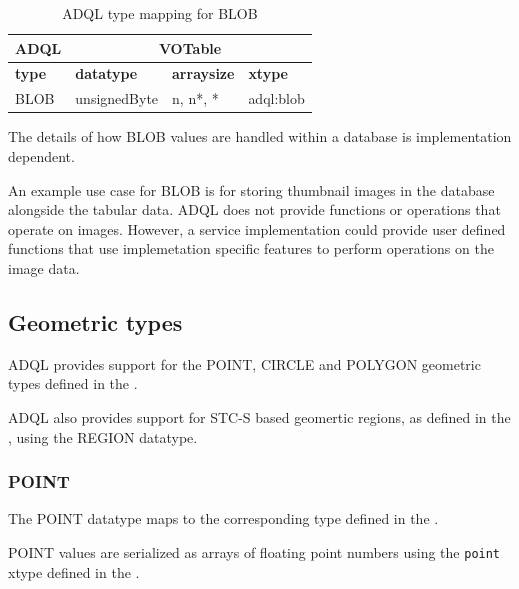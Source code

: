 \documentclass[11pt,a4paper]{ivoa}
\begin{document}
\begin{table}[th]\footnotesize
    \begin{tabular}
        {|p{}|p{}|p{}|p{}|}
        \hline

        \hline
        \multicolumn{1}{|c|}{\textbf{ADQL}} &
        \multicolumn{3}{|c|}{\textbf{VOTable}}
        \tabularnewline
        
        \hline
        \textbf{type} &
        \textbf{datatype} &
        \textbf{arraysize} &
        \textbf{xtype}
        \tabularnewline

        \hline
        BLOB &
        unsignedByte  &
        n, n*, * &
        adql:blob
        \tabularnewline

        \hline
    \end{tabular}
    \caption{ADQL type mapping for BLOB}
    \label{table:types.binary.blob}
\end{table}

The details of how BLOB values are handled within a
database is implementation dependent.

An example use case for BLOB is for storing thumbnail images
in the database alongside the tabular data.
ADQL does not provide functions or operations that operate on
images.
However, a service implementation could provide user defined
functions that use implemetation specific features to perform
operations on the image data.

\subsection{Geometric types}
\label{sec:types.geom}

ADQL provides support for the POINT, CIRCLE and POLYGON geometric
types defined in the \DALISpec.

ADQL also provides support for STC-S based geomertic regions,
as defined in the \STCSSpec, using the REGION datatype.

\subsubsection{POINT}
\label{sec:types.geom.point}

The POINT datatype maps to the corresponding type defined in the
\DALISpec.

POINT values are serialized as arrays of floating point numbers
using the \verb:point: xtype defined in the \DALISpec.
\end{document}
